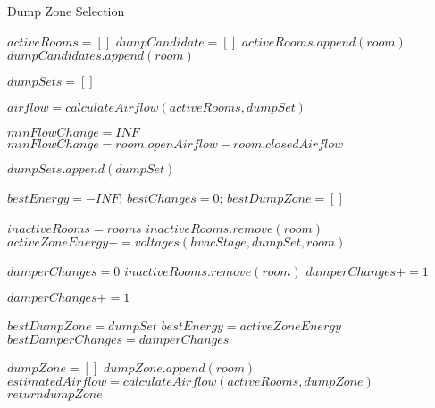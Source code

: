 \begin{algorithm}                      %
\caption{Dump Zone Selection}          %
\label{alg:dumpZoneSelection}%
\begin{algorithmic}                    %
\STATE $activeRooms = []$
\STATE $dumpCandidate = []$
\STATE $activeRooms.append(room)$
\ELSE
\STATE $dumpCandidates.append(room)$
\ENDIF
\ENDFOR

\STATE $dumpSets = []$


\STATE $airflow = calculateAirflow(activeRooms, dumpSet)$

\STATE $minFlowChange = INF$
\STATE $minFlowChange = room.openAirflow - room.closedAirflow$
\ENDIF
\ENDFOR

\STATE $dumpSets.append(dumpSet)$
\ENDIF

\ENDFOR

\STATE $bestEnergy = -INF$; $bestChanges = 0$; $bestDumpZone = []$

\STATE $inactiveRooms = rooms$
\STATE $inactiveRooms.remove(room)$
\STATE $activeZoneEnergy += voltages(hvacStage, dumpSet, room)$
\ENDFOR

\STATE $damperChanges = 0$
\STATE $inactiveRooms.remove(room)$
\STATE $damperChanges += 1$
\ENDIF
\ENDFOR

\STATE $damperChanges += 1$
\ENDIF
\ENDFOR

\STATE $bestDumpZone = dumpSet$
\STATE $bestEnergy = activeZoneEnergy$
\STATE $bestDamperChanges = damperChanges$
\ENDIF

\ENDFOR

\STATE $dumpZone = []$
\STATE $dumpZone.append(room)$
\STATE $estimatedAirflow = calculateAirflow(activeRooms, dumpZone)$
\STATE $return dumpZone$
\ENDIF
\ENDFOR

\end{algorithmic}
\end{algorithm}

